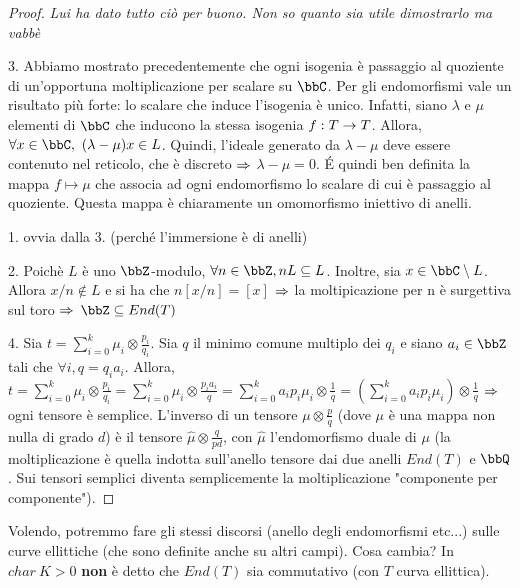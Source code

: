     \begin{proof} {\it Lui ha dato tutto ciò per buono. Non so quanto sia utile dimostrarlo ma vabbè}

    3. Abbiamo mostrato precedentemente che ogni isogenia è passaggio al quoziente di un'opportuna moltiplicazione per scalare su $\bbC$. Per gli endomorfismi vale un risultato più forte: lo scalare che induce l'isogenia è unico.
    Infatti, siano $\lambda$ e $\mu$ elementi di $\bbC$ che inducono la stessa isogenia $f:T\rightarrow T$. Allora, $\forall x\in \bbC,  \ (\lambda - \mu)x \in L$. Quindi, l'ideale generato da $\lambda -\mu$ deve essere contenuto nel reticolo, che è discreto $\Rightarrow$ $\lambda - \mu = 0$. \'E quindi ben definita la mappa $f \mapsto \mu$ che associa ad ogni endomorfismo lo scalare di cui è passaggio al quoziente. Questa mappa è chiaramente un omomorfismo iniettivo di anelli.

    1. ovvia dalla 3. (perché l'immersione è di anelli)

    2. Poichè $L$ è uno $\bbZ$-modulo, $\forall n \in \bbZ, nL\subseteq L$. Inoltre, sia $x\in \bbC \setminus L$. Allora $x/n \not\in L$ e si ha che $n[x/n]=[x]$ $\Rightarrow$ la moltipicazione per n è surgettiva sul toro $\Rightarrow$ $\bbZ \subseteq End(T)$

    4. Sia $t=\sum\limits_{i=0}^{k} \mu_{i} \otimes \frac{p_{i}}{q_{i}}$. Sia $q$ il minimo comune multiplo dei $q_{i}$ e siano $a_{i} \in \bbZ$ tali che $\forall i, q=q_{i}a_{i}$. Allora,\\
    $t=\sum\limits_{i=0}^{k} \mu_{i}\otimes \frac{p_{i}}{q_{i}} = \sum\limits_{i=0}^{k} \mu_{i} \otimes \frac{p_{i}a_{i}}{q}= \sum\limits_{i=0}^{k} a_{i}p_{i}\mu_{i}\otimes \frac{1}{q} = (\sum\limits_{i=0}^{k} a_{i}p_{i}\mu_{i})\otimes \frac{1}{q}$ $\Rightarrow$ ogni tensore è semplice. L'inverso di un tensore $\mu \otimes \frac{p}{q}$ (dove $\mu$ è una mappa non nulla di grado $d$) è il tensore $\hat{\mu} \otimes \frac{q}{pd}$, con $\hat{\mu}$ l'endomorfismo duale di $\mu$ (la moltiplicazione è quella indotta sull'anello tensore dai due anelli $End(T)$ e $\bbQ$. Sui tensori semplici diventa semplicemente la moltiplicazione "componente per componente").
    \end{proof}

    Volendo, potremmo fare gli stessi discorsi (anello degli endomorfismi etc...) sulle curve ellittiche (che sono definite anche su altri campi). Cosa cambia? In $char \ K >0$ {\bf non } è detto che $End(T)$ sia commutativo (con $T$ curva ellittica).

